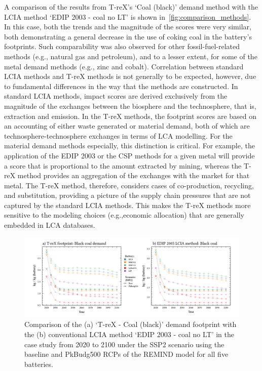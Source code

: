 A comparison of the results from T-reX's `Coal (black)' demand method with the LCIA method `EDIP 2003 - coal no LT' is shown in~\autoref{fig:comparison_methods}. In this case, both the trends and the magnitude of the scores were very similar, both demonstrating a general decrease in the use of coking coal in the battery's footprints. Such comparability was also observed for other fossil-fuel-related methods (e.g., natural gas and petroleum), and to a lesser extent, for some of the metal demand methods (e.g., zinc and cobalt). Correlation between standard LCIA methods and T-reX methods is not generally to be expected, however, due to fundamental differences in the way that the methods are constructed. In standard LCIA methods, impact scores are derived exclusively from the magnitude of the exchanges between the biosphere and the technosphere, that is, extraction and emission. In the T-reX methods, the footprint scores are based on an accounting of either waste generated or material demand, both of which are technosphere-technosphere exchanges in terms of LCA modelling. For the material demand methods especially, this distinction is critical. For example, the application of the EDIP 2003 or the CSP methods for a given metal will provide a score that is proportional to the amount extracted by mining, whereas the T-reX method provides an aggregation of the exchanges with the market for that metal. The T-reX method, therefore, considers cases of co-production, recycling, and substitution, providing a picture of the supply chain pressures that are not captured by the standard LCIA methods. This makes the T-reX methods more sensitive to the modeling choices (e.g.,economic allocation) that are generally embedded in LCA databases.

\begin{figure}[H]
    \centering
    \includegraphics[width=16cm]{figures/T-reX-coalANDedip.pdf}
    \caption{Comparison of the (a) `T-reX - Coal (black)' demand footprint with the (b) conventional LCIA method `EDIP 2003 - coal no LT'  in the case study from 2020 to 2100 under the SSP2 scenario using the baseline and PkBudg500 RCPs of the REMIND model for all five batteries.}\label{fig:comparison_methods}
\end{figure}

